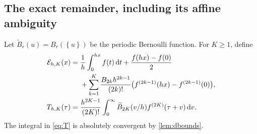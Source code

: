 \documentclass[11pt,a4paper]{article}
\numberwithin{equation}{section}
\theoremstyle{definition}
\newcommand{\dd}{\,\mathrm d}
\newcommand{\fracpart}[1]{\left\{#1\right\}}
\newcommand{\bB}{\widetilde B}
\begin{document}
\subsection{The exact remainder, including its affine ambiguity}
Let $\bB_r(u)=B_r(\fracpart{u})$ be the periodic Bernoulli function. For $K\ge1$, define
\begin{align}
\mathcal E_{h,K}(x)
={}&\frac1h\int_0^{hx}f(t)\dd t+\frac{f(hx)-f(0)}2 \notag\\
&+\sum_{k=1}^K\frac{B_{2k}h^{2k-1}}{(2k)!}
       \bigl(f^{(2k-1)}(hx)-f^{(2k-1)}(0)\bigr),
\label{eq:Eprimitive}\\
T_{h,K}(\tau)
={}&\frac{h^{2K-1}}{(2K)!}\int_0^{\infty}
 \bB_{2K}(v/h)f^{(2K)}(\tau+v)\dd v.
\label{eq:T}
\end{align}
The integral in \eqref{eq:T} is absolutely convergent by \cref{lem:dbounds}.
\end{document}
